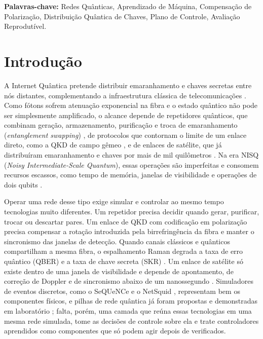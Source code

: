 \documentclass[12pt]{article}
\begin{document}
\noindent\textbf{Palavras-chave:} Redes Quânticas, Aprendizado de Máquina,
Compensação de Polarização, Distribuição Quântica de Chaves, Plano de Controle,
Avaliação Reprodutível.

\section{Introdução}

A Internet Quântica pretende distribuir emaranhamento e chaves secretas entre
nós distantes, complementando a infraestrutura clássica de telecomunicações
\cite{kimble2008,wehner2018}. Como fótons sofrem atenuação exponencial na fibra
e o estado quântico não pode ser simplesmente amplificado, o alcance depende de
repetidores quânticos, que combinam geração, armazenamento, purificação e troca
de emaranhamento (\textit{entanglement swapping})
\cite{briegel1998,dur1999,azuma2023}, de protocolos que contornam o limite de um
enlace direto, como a QKD de campo gêmeo \cite{lucamarini2018,pirandola2017}, e de
enlaces de satélite, que já distribuíram emaranhamento e chaves por mais de mil
quilômetros \cite{yin2017,liao2017,lu2022}. Na era NISQ (\textit{Noisy
Intermediate-Scale Quantum}), essas operações são imperfeitas e consomem
recursos escassos, como tempo de memória, janelas de visibilidade e operações de
dois qubits \cite{preskill2018}.

Operar uma rede desse tipo exige simular e controlar ao mesmo tempo tecnologias
muito diferentes. Um repetidor precisa decidir quando gerar, purificar, trocar ou
descartar pares. Um enlace de QKD com codificação em polarização precisa
compensar a rotação introduzida pela birrefringência da fibra \cite{xavier2008} e
manter o sincronismo das janelas de detecção. Quando canais clássicos e
quânticos compartilham a mesma fibra, o espalhamento Raman degrada a taxa de
erro quântico (QBER) e a taxa de chave secreta (SKR)
\cite{eraerds2010,patel2012,thomas2023}. Um enlace de satélite só existe dentro
de uma janela de visibilidade e depende de apontamento, de correção de Doppler e
de sincronismo abaixo de um nanossegundo \cite{yin2017,liao2017}. Simuladores de
eventos discretos, como o SeQUeNCe \cite{wu2021} e o NetSquid
\cite{coopmans2021}, representam bem os componentes físicos, e pilhas de rede
quântica já foram propostas \cite{dahlberg2019} e demonstradas em laboratório
\cite{pompili2022,delledonne2025}; falta, porém, uma camada que
reúna essas tecnologias em uma mesma rede simulada, tome as decisões de controle
sobre ela e trate controladores aprendidos \cite{le2022} como componentes que
só podem agir depois de verificados.
\end{document}
